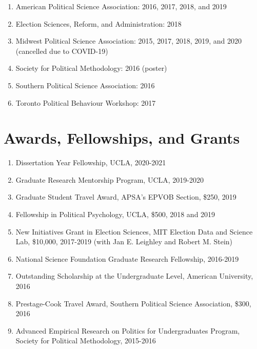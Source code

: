 \documentclass[12pt]{article}
\begin{document}
\begin{enumerate}[topsep = 0pt, itemsep = 1ex, partopsep  = 1ex, parsep = 1ex]
	
	\item[] American Political Science Association: 2016, 2017, 2018, and 2019
	
	\item[] Election Sciences, Reform, and Administration: 2018 
	
	\item[] Midwest Political Science Association: 2015, 2017, 2018, 2019, and 2020 (cancelled due to COVID-19)
	
	\item[] Society for Political Methodology: 2016 (poster)
	
	\item[] Southern Political Science Association: 2016
	
	\item[] Toronto Political Behaviour Workshop: 2017
	
\end{enumerate}

\section*{Awards, Fellowships, and Grants} 

\begin{enumerate}[topsep = 0pt, itemsep = 1ex, partopsep  = 1ex, parsep = 1ex]

	\item[] Dissertation Year Fellowship, UCLA, 2020-2021
	
	\item[] Graduate Research Mentorship Program, UCLA, 2019-2020
	
	\item[] Graduate Student Travel Award, APSA's EPVOB Section, \$250, 2019
	
	\item[] Fellowship in Political Psychology, UCLA, \$500, 2018 and 2019
	
	\item[] New Initiatives Grant in Election Sciences, MIT Election Data and Science Lab, \$10,000, 2017-2019 (with Jan E. Leighley and Robert M. Stein)
	
	\item[] National Science Foundation Graduate Research Fellowship, 2016-2019
	
	\item[] Outstanding Scholarship at the Undergraduate Level, American University, 2016
	
	\item[] Prestage-Cook Travel Award, Southern Political Science Association, \$300, 2016
	
	\item[] Advanced Empirical Research on Politics for Undergraduates Program, Society for Political Methodology, 2015-2016
	
\end{enumerate}
\end{document}
